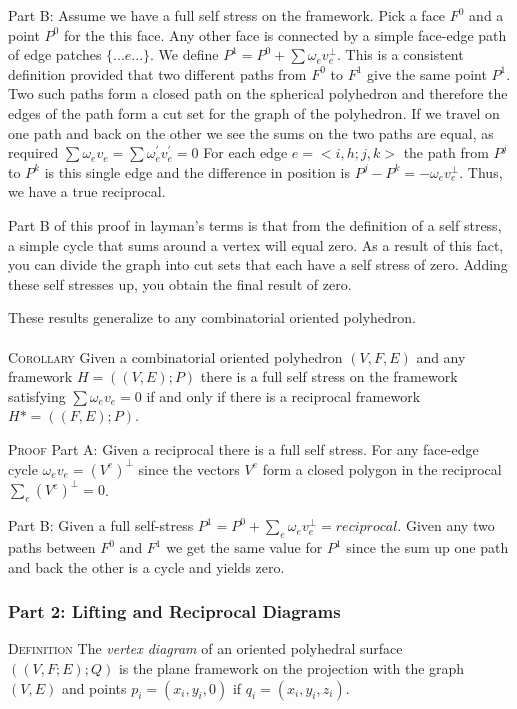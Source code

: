 \documentclass[11pt]{article}
\begin{document}
Part B: Assume we have a full self stress on the framework.
Pick a face $F^0$ and a point $P^0$ for the this face. Any other face is connected by a simple face-edge path of edge patches $\{...e...\}$. We define $P^1 = P^0 + \sum\omega_ev_e^\bot$. This is a consistent definition provided that two different paths from $F^0$ to $F^1$ give the same point $P^1$. Two such paths form a closed path on the spherical polyhedron and therefore the edges of the path form a cut set for the graph of the polyhedron. If we travel on one path and back on the other we see the sums on the two paths are equal, as required $\sum\omega_ev_e = \sum\omega_e^{'}v_e^{'} = 0$ For each edge $e = <i,h;j,k>$ the path from $P^j$ to $P^k$ is this single edge and the difference in position is $P^j - P^k = -\omega_ev_e^\bot$. Thus, we have a true reciprocal.

Part B of this proof in layman's terms is that from the definition of a self stress, a simple cycle that sums around a vertex will equal zero. As a result of this fact, you can divide the graph into cut sets that each have a self stress of zero. Adding these self stresses up, you obtain the final result of zero.

These results generalize to any combinatorial oriented polyhedron. \\
\\
\textsc{Corollary} Given a combinatorial oriented polyhedron $(V,F,E)$ and any framework $H = ((V,E);P)$ there is a full self stress on the framework satisfying $\sum \omega_ev_e = 0$ if and only if there is a reciprocal framework $H* = ((F,E);P)$. 

\textsc{Proof} Part A: Given a reciprocal there is a full self stress.
For any face-edge cycle $\omega_e v_e = (V^e)^{\bot}$ since the vectors $V^e$ form a closed polygon in the reciprocal $\sum_e(V^e)^\bot = 0$.

Part B: Given a full self-stress $P^1 = P^0 + \sum_e \omega_ev_e^\bot = reciprocal$.
Given any two paths between $F^0$ and $F^1$ we get the same value for $P^1$ since the sum up one path and back the other is a cycle and yields zero.


\subsubsection{Part 2: Lifting and Reciprocal Diagrams}
\textsc{Definition} The \emph{vertex diagram} of an oriented polyhedral surface $((V,F;E);Q)$ is the plane framework on the projection with the graph $(V,E)$ and points $p_i = (x_i,y_i,0)$ if $q_i = (x_i,y_i,z_i)$.
\end{document}
